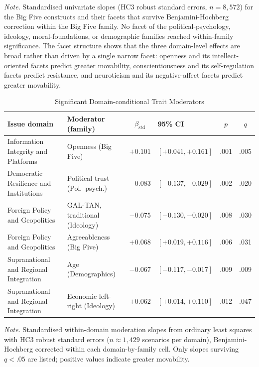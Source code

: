 \documentclass[11pt,a4paper]{article}
\newcommand{\floatleft}{\setlength{\parindent}{0pt}\RaggedRight}
\newcommand{\apanote}[1]{\par\vspace{3pt}\begingroup\footnotesize\setstretch{1.06}%
  \textit{Note.} #1\par\endgroup}
\begin{document}
\begin{table}[H]
\begin{tabularx}{\linewidth}{@{}Yccc@{}}
\bottomrule
\end{tabularx}
\endgroup
\apanote{Standardised univariate slopes (HC3 robust standard errors, $n = 8{,}572$) for the Big
Five constructs and their facets that survive Benjamini-Hochberg correction within the Big Five
family. No facet of the political-psychology, ideology, moral-foundations, or demographic
families reached within-family significance. The facet structure shows that the three
domain-level effects are broad rather than driven by a single narrow facet: openness and its
intellect-oriented facets predict greater movability, conscientiousness and its
self-regulation facets predict resistance, and neuroticism and its negative-affect facets
predict greater movability.}
\end{table}

\clearpage

\begin{table}[H]
\floatleft
\caption{Significant Domain-conditional Trait Moderators}
\label{tab:bydomain}
\vspace{2pt}
\begingroup\small
\begin{tabularx}{\linewidth}{@{}Yp{3.0cm}cp{2.4cm}cc@{}}
\toprule
Issue domain & Moderator (family) & $\beta_{\text{std}}$ & 95\% CI & $p$ & $q$ \\
\midrule
Information Integrity and Platforms & Openness (Big Five) & $+0.101$ & $[+0.041, +0.161]$ & .001 & .005 \\
Democratic Resilience and Institutions & Political trust (Pol.\ psych.) & $-0.083$ & $[-0.137, -0.029]$ & .002 & .020 \\
Foreign Policy and Geopolitics & GAL-TAN, traditional (Ideology) & $-0.075$ & $[-0.130, -0.020]$ & .008 & .030 \\
Foreign Policy and Geopolitics & Agreeableness (Big Five) & $+0.068$ & $[+0.019, +0.116]$ & .006 & .031 \\
Supranational and Regional Integration & Age (Demographics) & $-0.067$ & $[-0.117, -0.017]$ & .009 & .009 \\
Supranational and Regional Integration & Economic left-right (Ideology) & $+0.062$ & $[+0.014, +0.110]$ & .012 & .047 \\
\bottomrule
\end{tabularx}
\endgroup
\apanote{Standardised within-domain moderation slopes from ordinary least squares with HC3 robust
standard errors ($n \approx 1{,}429$ scenarios per domain), Benjamini-Hochberg corrected within each
domain-by-family cell. Only slopes surviving $q<.05$ are listed; positive values indicate greater
movability.}
\end{table}
\end{document}
